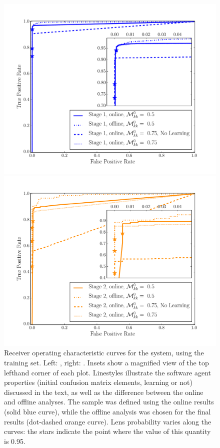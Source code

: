\documentclass[useAMS,usenatbib,a4paper]{mn2e}
\begin{document}
\begin{figure}
\begin{minipage}{0.48\linewidth}
  \centering\includegraphics[width=\linewidth]{stage1_ROC.pdf}
\end{minipage}\hfill
\begin{minipage}{0.48\linewidth}
  \centering\includegraphics[width=\linewidth]{stage2_ROC.pdf}
\end{minipage}
\caption{Receiver operating characteristic curves for the \SW system, using
the \cfhtls training set. Left: \StageOne, right: \StageTwo. Insets show a
magnified view of the top lefthand corner of each plot. Linestyles illustrate
the software agent properties (initial confusion matrix elements, learning or not)
discussed in the text, as well as the difference between the online and offline
analyses. The \StageTwo sample was defined using the online \StageOne results
(solid blue curve), while the offline analysis was chosen for the final
\StageTwo results (dot-dashed orange curve).
Lens probability varies along the curves: the stars indicate the point where
the value of this quantity is 0.95.}
\label{fig:results:sample:roc}
\end{figure}
\end{document}
